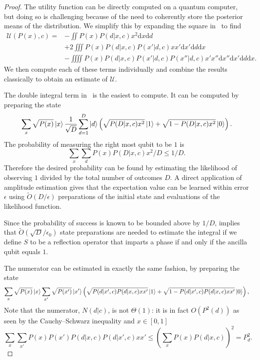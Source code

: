\documentclass[aps,amsmath,onecolumn,amssymb,notitlepage]{revtex4-1}
\begin{document}
\begin{proof}
The utility function can be directly computed on a quantum computer, but doing
so is challenging because of the need to coherently store the posterior means
of the distribution.  We simplify this by expanding the square in~
to find
\begin{align}
\mathcal{U}(P(x),c) = &-\iint P(x) P(d|x,c) x^2 \mathrm{d}x\mathrm{d}d\nonumber\\
&+2\iiint P(x) P(d|x,c) P(x'|d,c) xx' \mathrm{d}x' \mathrm{d}d\mathrm{d}x\nonumber\\
&-\iiiint P(x) P(d|x,c) P(x'|d,c)P(x''|d,c) x'x'' \mathrm{d}x''\mathrm{d}x' \mathrm{d}d\mathrm{d}x.\label{eq:multiutility}
\end{align}
We then compute each of these terms individually and combine the results classically to obtain an estimate of $\mathcal{U}$.

The double integral term in~ is the easiest to compute.  It can be computed by preparing the state
\begin{equation}
\sum_x \sqrt{P(x)} \left|x\right\rangle \frac{1}{\sqrt{D}}\sum_{d=1}^D \left|d\right\rangle\left(\sqrt{{P(D|x,c)x^2}}\left|1\right\rangle + \sqrt{1 -P(D|x,c)x^2}\left|0\right\rangle \right). 
\end{equation}
The probability of measuring the right most qubit to be $1$ is $$\sum_x\sum_d P(x)P(D|x,c)x^2/D \le 1/D.$$  Therefore the desired probability can be found by estimating the likelihood of observing $1$ divided by the total number of outcomes $D$.  A direct application of amplitude estimation gives that the expectation value can be learned within error $\epsilon$ using $\tilde{O}(D/\epsilon)$ preparations of the initial state and evaluations of the likelihood function.  

Since the probability of success is known to be bounded above by $1/D$,  implies that $\tilde{O}(\sqrt{D}/\epsilon_0)$ state preparations are needed to estimate the integral if we define $S$ to be a reflection operator that imparts a phase if and only if the ancilla qubit equals $1$.


The numerator can be estimated in exactly the same fashion, by preparing the state
\begin{equation}
\sum_x \sqrt{P(x)} \left|x\right\rangle\sum_{x'} \sqrt{P(x')} \left|x'\right\rangle \left(\sqrt{P(d|x',c){P(d|x,c)}xx'}\left|1\right\rangle + \sqrt{1 -P(d|x',c)P(d|x,c)xx'}\left|0\right\rangle \right),
\end{equation}
Note that the numerator, $N(d|c)$, is not $\Theta(1)$: it is in fact $O(P^2(d))$ as seen by the Cauchy--Schwarz inequality and $x\in [0,1]$
\begin{equation}
\sum_x \sum_{x'} P(x) P(x') P(d|x,c) P(d|x',c) x x' \le \left(\sum_x P(x) P(d|x,c)\right)^2=P_d^2.
\end{equation}


\end{proof}
\end{document}
